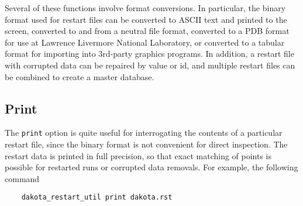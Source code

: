 Several of these functions involve format conversions. In particular,
the binary format used for restart files can be converted to ASCII
text and printed to the screen, converted to and from a neutral file
format, converted to a PDB format for use at Lawrence Livermore
National Laboratory, or converted to a tabular format for importing
into 3rd-party graphics programs. In addition, a restart file with
corrupted data can be repaired by value or id, and multiple restart
files can be combined to create a master database.

\subsection{Print}\label{restart:utility:print}

The \texttt{print} option is quite useful for interrogating the
contents of a particular restart file, since the binary format is not
convenient for direct inspection. The restart data is printed in full
precision, so that exact matching of points is possible for restarted
runs or corrupted data removals. For example, the following command
\begin{small}
\begin{verbatim}
    dakota_restart_util print dakota.rst
\end{verbatim}
\end{small}

